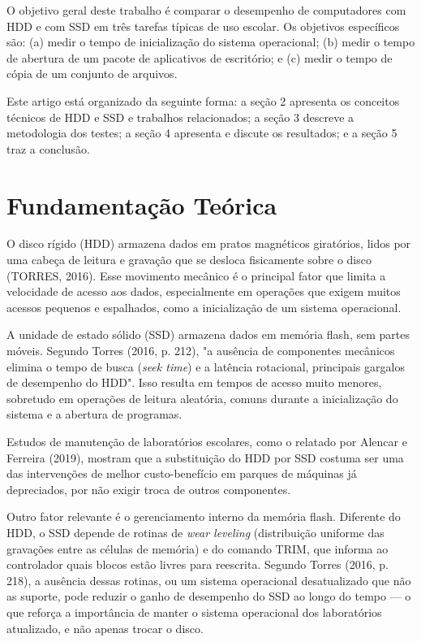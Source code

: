 \documentclass[article,12pt,a4paper,oneside]{abntex2}
\begin{document}
O objetivo geral deste trabalho é comparar o desempenho de computadores com
HDD e com SSD em três tarefas típicas de uso escolar. Os objetivos
específicos são: (a) medir o tempo de inicialização do sistema operacional;
(b) medir o tempo de abertura de um pacote de aplicativos de escritório; e
(c) medir o tempo de cópia de um conjunto de arquivos.

Este artigo está organizado da seguinte forma: a seção 2 apresenta os
conceitos técnicos de HDD e SSD e trabalhos relacionados; a seção 3 descreve
a metodologia dos testes; a seção 4 apresenta e discute os resultados; e a
seção 5 traz a conclusão.

\section{Fundamentação Teórica}

O disco rígido (HDD) armazena dados em pratos magnéticos giratórios, lidos
por uma cabeça de leitura e gravação que se desloca fisicamente sobre o
disco (TORRES, 2016). Esse movimento mecânico é o principal fator que limita
a velocidade de acesso aos dados, especialmente em operações que exigem
muitos acessos pequenos e espalhados, como a inicialização de um sistema
operacional.

A unidade de estado sólido (SSD) armazena dados em memória flash, sem partes
móveis. Segundo Torres (2016, p. 212), "a ausência de componentes mecânicos
elimina o tempo de busca (\textit{seek time}) e a latência rotacional,
principais gargalos de desempenho do HDD". Isso resulta em tempos de acesso
muito menores, sobretudo em operações de leitura aleatória, comuns durante
a inicialização do sistema e a abertura de programas.

Estudos de manutenção de laboratórios escolares, como o relatado por Alencar
e Ferreira (2019), mostram que a substituição do HDD por SSD costuma ser uma
das intervenções de melhor custo-benefício em parques de máquinas já
depreciados, por não exigir troca de outros componentes.

Outro fator relevante é o gerenciamento interno da memória flash. Diferente
do HDD, o SSD depende de rotinas de \textit{wear leveling} (distribuição
uniforme das gravações entre as células de memória) e do comando TRIM, que
informa ao controlador quais blocos estão livres para reescrita. Segundo
Torres (2016, p. 218), a ausência dessas rotinas, ou um sistema operacional
desatualizado que não as suporte, pode reduzir o ganho de desempenho do SSD
ao longo do tempo — o que reforça a importância de manter o sistema
operacional dos laboratórios atualizado, e não apenas trocar o disco.
\end{document}
